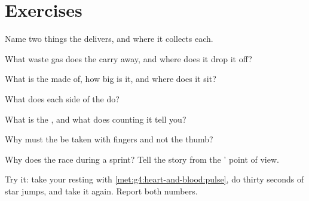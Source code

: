 \section{Exercises}

\begin{exercise}[$\star$]\label{exo:g4:heart-and-blood:1}
Name two things the  delivers, and where it collects
each.
\end{exercise}

\begin{exercise}[$\star$]\label{exo:g4:heart-and-blood:2}
What waste gas does the  carry away, and where does it
drop it off?
\end{exercise}

\begin{exercise}[$\star$]\label{exo:g4:heart-and-blood:3}
What is the  made of, how big is it, and where does it
sit?
\end{exercise}

\begin{exercise}[$\star$]\label{exo:g4:heart-and-blood:4}
What does each side of the  do?
\end{exercise}

\begin{exercise}[$\star$]\label{exo:g4:heart-and-blood:5}
What is the , and what does counting it tell you?
\end{exercise}

\begin{exercise}[$\star$]\label{exo:g4:heart-and-blood:6}
Why must the  be taken with fingers and not the thumb?
\end{exercise}

\begin{exercise}[$\star$]\label{exo:g4:heart-and-blood:7}
Why does the  race during a sprint? Tell the story from
the  ' point of view.
\end{exercise}

\begin{exercise}[$\star$]\label{exo:g4:heart-and-blood:8}
Try it: take your resting  with
\cref{met:g4:heart-and-blood:pulse}, do thirty seconds of
star jumps, and take it again. Report both numbers.
\end{exercise}


